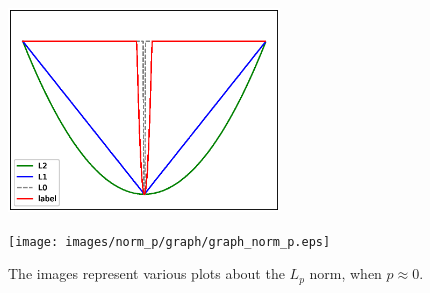 \begin{figure}[tb]
\vspace{-15pt}
	\begin{minipage}[b]{0.5\hsize}
		\centering
		\includegraphics[width=72mm, height = 54mm]{images/norm_p/graph/graph_norm.eps}
		 \label{fig:nom_p/comparison}
	\end{minipage}
	\begin{minipage}[b]{0.5\hsize}
		\centering
		\texttt{[image: images/norm\_p/graph/graph\_norm\_p.eps]}
		 \label{fig:nom_p/graph_norm_p}
	\end{minipage}
	\caption{The images represent various plots about the $L_{p}$ norm, when $p \approx 0$.}
	\label{fig:graph_lp}
\end{figure}
